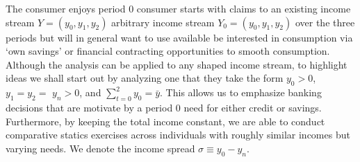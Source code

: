 \documentclass[11pt]{article}%
\providecommand{\DIFadd}[1]{{\protect\color{blue} \sf #1}} %
\providecommand{\DIFdel}[1]{{\protect\color{red} \scriptsize #1}} %
\providecommand{\DIFaddbegin}{} %
\providecommand{\DIFaddend}{} %
\providecommand{\DIFdelbegin}{} %
\providecommand{\DIFdelend}{} %
\begin{document}
The \DIFdelbegin \DIFdel{consumer enjoys }\DIFdelend \DIFaddbegin \DIFadd{period 0 consumer starts with }\DIFaddend claims to an existing \DIFdelbegin \DIFdel{income stream $Y=\left(
y_{0},y_{1},y_{2}\right) $ }\DIFdelend \DIFaddbegin \DIFadd{arbitrary income stream
$Y_{0}=\left(  y_{0},y_{1},y_{2}\right)  $ }\DIFaddend over the three periods but will in general \DIFdelbegin \DIFdel{want
to use available }\DIFdelend \DIFaddbegin \DIFadd{be interested in consumption via `own savings' or  }\DIFaddend financial contracting opportunities \DIFdelbegin \DIFdel{to smooth consumption. }%
\DIFdel{Although the analysis can be applied to any shaped income stream, to
highlight ideas we shall start out by analyzing one that they take the form $%
y_{0}>0$, $y_{1}=y_{2}=$ $y_{n}>0$, and $\sum_{t=0}^{2}y_{0}=\bar{y}$. This
allows us to emphasize banking decisions that are motivate by a period 0
need for either credit or savings. Furthermore, by keeping the total income
constant, we are able to conduct comparative statics exercises across
individuals with roughly similar incomes but varying needs. We denote the
income spread $\sigma \equiv y_{0}-y_{n}$.
}%
\end{document}
